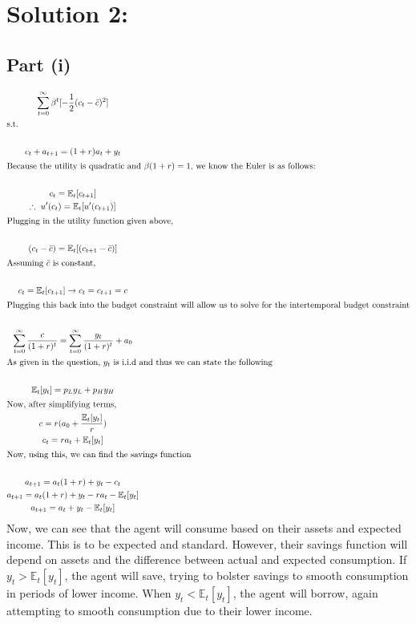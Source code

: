 \documentclass[10pt,a4paper]{article}
\begin{document}
\section*{Solution 2:} 
  \subsection*{Part (i)}
    \begin{gather*}
      \sum\limits_{t=0}^{\infty}\beta^t[-\frac{1}{2}(c_t -
      \bar{c})^2] \\
      \shortintertext{s.t.} \\
      c_t + a_{t+1} = (1+r)a_t + y_t \\
      \shortintertext{Because the utility is quadratic and $\beta(1+r) = 1$, we know the Euler is as follows:} \\
      c_t = \mathbb{E}_t[c_{t+1}] \\
      \therefore \ u'(c_t) = \mathbb{E}_t[u'(c_{t+1})] \\
      \shortintertext{Plugging in the utility function given above,} \\
      (c_t - \bar{c}) = \mathbb{E}_t[(c_{t+1} - \bar{c})] \\
      \shortintertext{Assuming $\bar{c}$ is constant,} \\
      c_t = \mathbb{E}_t[c_{t+1}] \rightarrow c_t = c_{t+1} = c \\
      \shortintertext{Plugging this back into the budget constraint will allow us to solve for the intertemporal budget constraint} \\
      \sum\limits_{t=0}^{\infty}\frac{c}{(1+r)^t} = \sum\limits_{t=0}^{\infty}\frac{y_t}{(1+r)^t} + a_0 \\
      \shortintertext{As given in the question, $y_t$ is i.i.d and thus we can state the following } \\
      \mathbb{E}_t[y_t] = p_Ly_L + p_Hy_H \\
      \shortintertext{Now, after simplifying terms,}
      c = r(a_0 + \frac{\mathbb{E}_t[y_t]}{r}) \\
      c_t = ra_t + \mathbb{E}_t[y_t] \\
      \shortintertext{Now, using this, we can find the savings function} \\
      a_{t+1} = a_t(1+r) + y_t - c_t \\
      a_{t+1} = a_t(1+r) + y_t - ra_t - \mathbb{E}_t[y_t] \\
      a_{t+1} = a_t + y_t - \mathbb{E}_t[y_t] \\
    \end{gather*}
    Now, we can see that the agent will consume based on their assets and expected income. This is to be expected and standard. However, their savings function will depend on assets and the difference between actual and expected consumption. If $y_t > \mathbb{E}_t[y_t]$, the agent will save, trying to bolster savings to smooth consumption in periods of lower income. When $y_t < \mathbb{E}_t[y_t]$, the agent will borrow, again attempting to smooth consumption due to their lower income. 
\end{document}
